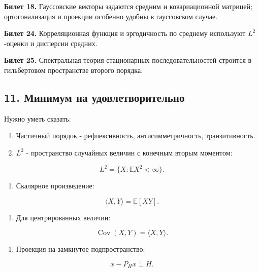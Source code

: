 \documentclass[
  11pt,
  a4paper,
]{article}
\providecommand{\tightlist}{%
  \setlength{\itemsep}{0pt}\setlength{\parskip}{0pt}}
\begin{document}
\textbf{Билет 18.} Гауссовские векторы задаются средним и ковариационной
матрицей; ортогонализация и проекции особенно удобны в гауссовском
случае.

\textbf{Билет 24.} Корреляционная функция и эргодичность по среднему
используют \(L^2\)-оценки и дисперсии средних.

\textbf{Билет 25.} Спектральная теория стационарных последовательностей
строится в гильбертовом пространстве второго порядка.

\subsection{11. Минимум на
удовлетворительно}\label{ux43cux438ux43dux438ux43cux443ux43c-ux43dux430-ux443ux434ux43eux432ux43bux435ux442ux432ux43eux440ux438ux442ux435ux43bux44cux43dux43e}

Нужно уметь сказать:

\begin{enumerate}
\def\labelenumi{\arabic{enumi}.}
\tightlist
\item
  Частичный порядок - рефлексивность, антисимметричность,
  транзитивность.
\item
  \(L^2\) - пространство случайных величин с конечным вторым моментом:
\end{enumerate}

\[
L^2=\{X:\mathbb EX^2<\infty\}.
\]

\begin{enumerate}
\def\labelenumi{\arabic{enumi}.}
\setcounter{enumi}{2}
\tightlist
\item
  Скалярное произведение:
\end{enumerate}

\[
\langle X,Y\rangle=\mathbb E[XY].
\]

\begin{enumerate}
\def\labelenumi{\arabic{enumi}.}
\setcounter{enumi}{3}
\tightlist
\item
  Для центрированных величин:
\end{enumerate}

\[
\operatorname{Cov}(X,Y)=\langle X,Y\rangle.
\]

\begin{enumerate}
\def\labelenumi{\arabic{enumi}.}
\setcounter{enumi}{4}
\tightlist
\item
  Проекция на замкнутое подпространство:
\end{enumerate}

\[
x-P_Hx\perp H.
\]
\end{document}
